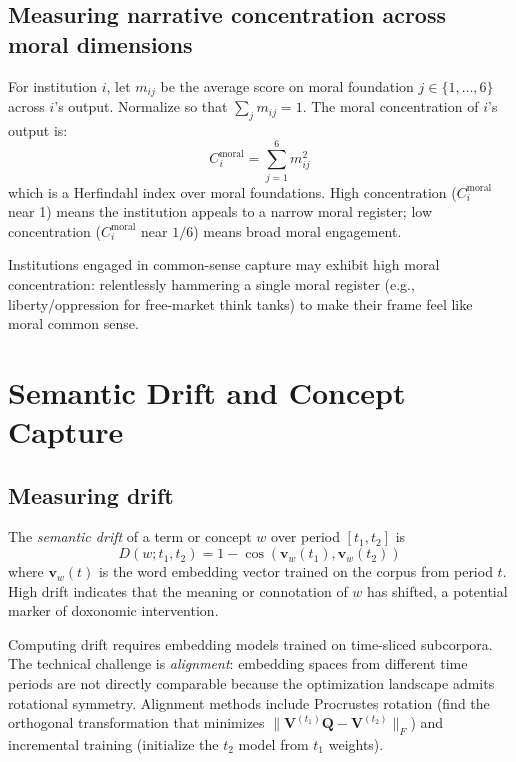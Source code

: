 \subsection{Measuring narrative concentration across moral dimensions}

\begin{definition}
\label{def:moral-concentration}
For institution $i$, let $m_{ij}$ be the average score on moral foundation $j \in \{1, \ldots, 6\}$ across $i$'s output.
Normalize so that $\sum_j m_{ij} = 1$.
The moral concentration of $i$'s output is:
\[
  C_i^{\text{moral}} = \sum_{j=1}^{6} m_{ij}^2
\]
which is a Herfindahl index over moral foundations.
High concentration ($C_i^{\text{moral}}$ near 1) means the institution appeals to a narrow moral register; low concentration ($C_i^{\text{moral}}$ near $1/6$) means broad moral engagement.
\end{definition}

Institutions engaged in common-sense capture may exhibit high moral concentration: relentlessly hammering a single moral register (e.g., liberty/oppression for free-market think tanks) to make their frame feel like moral common sense.

\section{Semantic Drift and Concept Capture}
\label{sec:ch17-drift}

\subsection{Measuring drift}

\begin{definition}
\label{def:drift}
The \emph{semantic drift} of a term or concept $w$ over period $[t_1, t_2]$ is
\[
  D(w; t_1, t_2) = 1 - \cos(\bm{v}_w(t_1), \bm{v}_w(t_2))
\]
where $\bm{v}_w(t)$ is the word embedding vector trained on the corpus from period $t$.
High drift indicates that the meaning or connotation of $w$ has shifted, a potential marker of doxonomic intervention.
\end{definition}

Computing drift requires embedding models trained on time-sliced subcorpora.
The technical challenge is \emph{alignment}: embedding spaces from different time periods are not directly comparable because the optimization landscape admits rotational symmetry.
Alignment methods include Procrustes rotation (find the orthogonal transformation that minimizes $\|\mathbf{V}^{(t_1)} \mathbf{Q} - \mathbf{V}^{(t_2)}\|_F$) and incremental training (initialize the $t_2$ model from $t_1$ weights).

